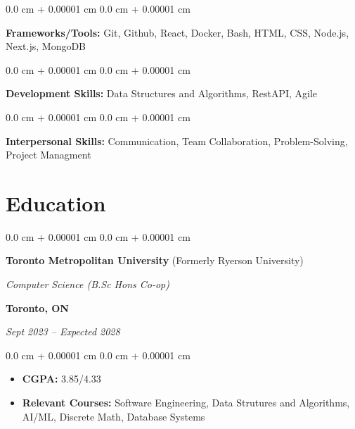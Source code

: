 \documentclass[10pt, letterpaper]{article}
\newenvironment{highlightsforbulletentries}{
    \begin{itemize}[
        topsep=0.10 cm,
        parsep=0.10 cm,
        partopsep=0pt,
        itemsep=0pt,
        leftmargin=10pt
    ]
}{
    \end{itemize}
} %
\newenvironment{onecolentry}{
    \begin{adjustwidth}{
        0.0 cm + 0.00001 cm
    }{
        0.0 cm + 0.00001 cm
    }
}{
    \end{adjustwidth}
} %
\newenvironment{twocolentry}[2][]{
    \onecolentry
    \def\secondColumn{#2}
    \setcolumnwidth{\fill, 4.5 cm}
    \begin{paracol}{2}
}{
    \switchcolumn \raggedleft \secondColumn
    \end{paracol}
    \endonecolentry
} %
\begin{document}
        \begin{onecolentry}
            \textbf{Frameworks/Tools:} Git, Github, React, Docker, Bash, HTML, CSS, Node.js, Next.js, MongoDB
        \end{onecolentry}

        \vspace{0.05 cm}

        \begin{onecolentry}
            \textbf{Development Skills:} Data Structures and Algorithms, RestAPI, Agile
        \end{onecolentry}

        \vspace{0.05 cm}

        \begin{onecolentry}
            \textbf{Interpersonal Skills:} Communication, Team Collaboration, Problem-Solving, Project Managment
        \end{onecolentry}



    
    \section{Education}
        \begin{twocolentry}{
        \textbf{Toronto, ON}    
            
        \textit{Sept 2023 – Expected 2028}}
            \textbf{Toronto Metropolitan University} (Formerly Ryerson University)
            
            \textit{Computer Science (B.Sc Hons Co-op)}
        \end{twocolentry}

        \vspace{0.05cm}

        \begin{onecolentry}
            \begin{highlightsforbulletentries}

            \item \textbf{CGPA:} 3.85/4.33 
            \item \textbf{Relevant Courses:} Software Engineering, Data Strutures 
            and Algorithms, AI/ML, Discrete Math, Database Systems
            
            \end{highlightsforbulletentries}
        \end{onecolentry}

    
\end{document}
